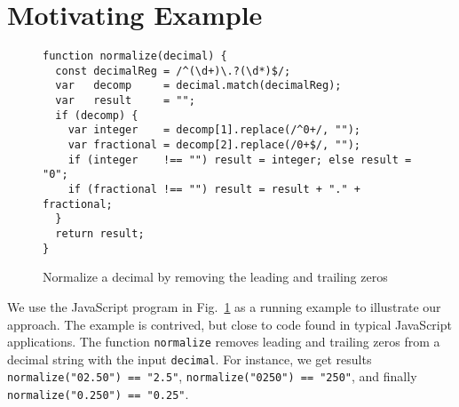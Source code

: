
\section{Motivating Example}\label{sec:mot}

\begin{figure}[tb]
\begin{center}
\begin{verbatim}
function normalize(decimal) {
  const decimalReg = /^(\d+)\.?(\d*)$/;
  var   decomp     = decimal.match(decimalReg);
  var   result     = "";
  if (decomp) {
    var integer    = decomp[1].replace(/^0+/, "");
    var fractional = decomp[2].replace(/0+$/, "");
    if (integer    !== "") result = integer; else result = "0"; 
    if (fractional !== "") result = result + "." + fractional;
  }
  return result;
}
\end{verbatim}
\end{center}
\vspace{-4mm}
\caption{Normalize a decimal by removing the leading and trailing zeros}
\label{fig-run-exmp}
\vspace{-4mm}
\end{figure}

We use the JavaScript program in Fig.~\ref{fig-run-exmp} as a running example to illustrate our approach. The example is
contrived, but close to code found in typical JavaScript
applications.
 The function {\tt normalize}   removes leading and trailing zeros from a decimal string with the input %
{\tt decimal}. For instance, we get results
 \verb!normalize("02.50") == "2.5"!,
 \verb!normalize("0250") == "250"!, and finally
 \verb!normalize("0.250") == "0.25"!.



